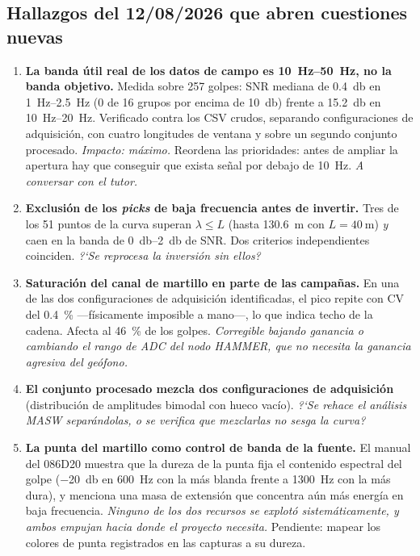 \subsection{Hallazgos del 12/08/2026 que abren cuestiones nuevas}

\begin{enumerate}[itemsep=0.35em]

\item \textbf{La banda \'util real de los datos de campo es
\SIrange{10}{50}{\hertz}, no la banda objetivo.} Medida sobre 257 golpes: SNR mediana de
\SI{0.4}{\decibel} en \SIrange{1}{2.5}{\hertz} (0 de 16 grupos por encima de
\SI{10}{\decibel}) frente a \SI{15.2}{\decibel} en \SIrange{10}{20}{\hertz}. Verificado
contra los CSV crudos, separando configuraciones de adquisici\'on, con cuatro longitudes
de ventana y sobre un segundo conjunto procesado. \emph{Impacto: m\'aximo.} Reordena las
prioridades: antes de ampliar la apertura hay que conseguir que exista se\~nal por debajo
de \SI{10}{\hertz}. \emph{A conversar con el tutor.}

\item \textbf{Exclusi\'on de los \emph{picks} de baja frecuencia antes de invertir.}
Tres de los 51 puntos de la curva superan $\lambda\le L$ (hasta
\SI{130.6}{\meter} con $L=\SI{40}{\meter}$) \emph{y} caen en la banda de
\SIrange{0}{2}{\decibel} de SNR. Dos criterios independientes coinciden. \emph{?`Se
reprocesa la inversi\'on sin ellos?}

\item \textbf{Saturaci\'on del canal de martillo en parte de las campa\~nas.} En una de
las dos configuraciones de adquisici\'on identificadas, el pico repite con CV del
\SI{0.4}{\percent} ---f\'isicamente imposible a mano---, lo que indica techo de la cadena.
Afecta al \SI{46}{\percent} de los golpes. \emph{Corregible bajando ganancia o cambiando
el rango de ADC del nodo HAMMER, que no necesita la ganancia agresiva del ge\'ofono.}

\item \textbf{El conjunto procesado mezcla dos configuraciones de adquisici\'on}
(distribuci\'on de amplitudes bimodal con hueco vac\'io). \emph{?`Se rehace el an\'alisis
MASW separ\'andolas, o se verifica que mezclarlas no sesga la curva?}

\item \textbf{La punta del martillo como control de banda de la fuente.} El manual del
086D20 muestra que la dureza de la punta fija el contenido espectral del golpe
(\SI{-20}{\decibel} en \SI{600}{\hertz} con la m\'as blanda frente a
\SI{1300}{\hertz} con la m\'as dura), y menciona una masa de extensi\'on que concentra
a\'un m\'as energ\'ia en baja frecuencia. \emph{Ninguno de los dos recursos se explot\'o
sistem\'aticamente, y ambos empujan hacia donde el proyecto necesita.} Pendiente: mapear
los colores de punta registrados en las capturas a su dureza.

\end{enumerate}

